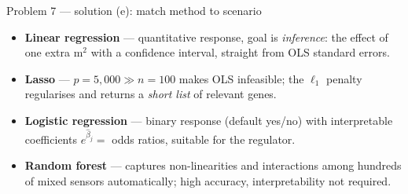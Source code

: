 \documentclass[aspectratio=169,11pt]{beamer}
\begin{document}
\begin{frame}{Problem 7 --- solution (e): match method to scenario}
  \begin{solutionbox}
    \begin{itemize}
      \item[(i)] \textbf{Linear regression} --- quantitative response, goal is \emph{inference}:
        the effect of one extra m$^2$ with a confidence interval, straight from OLS standard errors.
      \item[(ii)] \textbf{Lasso} --- $p=5{,}000\gg n=100$ makes OLS infeasible; the $\ell_1$
        penalty regularises and returns a \emph{short list} of relevant genes.
      \item[(iii)] \textbf{Logistic regression} --- binary response (default yes/no) with
        interpretable coefficients $e^{\hat\beta_j}=$ odds ratios, suitable for the regulator.
      \item[(iv)] \textbf{Random forest} --- captures non-linearities and interactions among
        hundreds of mixed sensors automatically; high accuracy, interpretability not required.
    \end{itemize}
  \end{solutionbox}
\end{frame}
\end{document}
